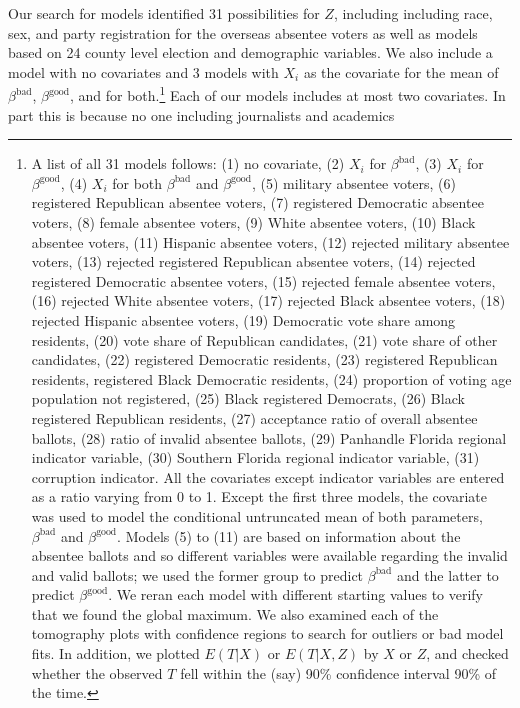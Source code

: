 \documentclass[11pt,titlepage]{article}
\newcommand{\bb}{\beta^{\text{bad}}}
\newcommand{\bg}{\beta^{\text{good}}}
\begin{document}
Our search for models identified 31 possibilities for $Z$, including
including race, sex, and party registration for the overseas absentee
voters as well as models based on 24 county level election and
demographic variables.  We also include a model with no covariates and
3 models with $X_i$ as the covariate for the mean of $\bb$, $\bg$, and
for both.\footnote{\label{f:models}A list of all 31 models follows:
  (1) no covariate, (2) $X_i$ for $\bb$, (3) $X_i$ for $\bg$, (4)
  $X_i$ for both $\bb$ and $\bg$, (5) military absentee voters, (6)
  registered Republican absentee voters, (7) registered Democratic
  absentee voters, (8) female absentee voters, (9) White absentee
  voters, (10) Black absentee voters, (11) Hispanic absentee voters,
  (12) rejected military absentee voters, (13) rejected registered
  Republican absentee voters, (14) rejected registered Democratic
  absentee voters, (15) rejected female absentee voters, (16) rejected
  White absentee voters, (17) rejected Black absentee voters, (18)
  rejected Hispanic absentee voters, (19) Democratic vote share among
  residents, (20) vote share of Republican candidates, (21) vote share
  of other candidates, (22) registered Democratic residents, (23)
  registered Republican residents, registered Black Democratic
  residents, (24) proportion of voting age population not registered,
  (25) Black registered Democrats, (26) Black registered Republican
  residents, (27) acceptance ratio of overall absentee ballots, (28)
  ratio of invalid absentee ballots, (29) Panhandle Florida regional
  indicator variable, (30) Southern Florida regional indicator
  variable, (31) corruption indicator. All the covariates except
  indicator variables are entered as a ratio varying from 0 to 1.
  Except the first three models, the covariate was used to model the
  conditional untruncated mean of both parameters, $\bb$ and $\bg$.
  Models (5) to (11) are based on information about the absentee
  ballots and so different variables were available regarding the
  invalid and valid ballots; we used the former group to predict $\bb$
  and the latter to predict $\bg$.  We reran each model with different
  starting values to verify that we found the global maximum.  We also
  examined each of the tomography plots with confidence regions to
  search for outliers or bad model fits.  In addition, we plotted
  $E(T|X)$ or $E(T|X,Z)$ by $X$ or $Z$, and checked whether the
  observed $T$ fell within the (say) 90\% confidence interval 90\% of
  the time.}  Each of our models includes at most two covariates.  In
part this is because no one including journalists and academics
\end{document}
